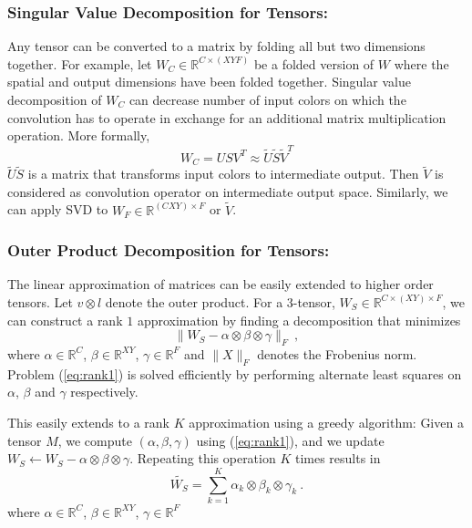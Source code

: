 \subsubsection{Singular Value Decomposition for Tensors:}\label{subsubsec:svd_tensor}
Any tensor can be converted to a matrix by folding all but two
dimensions together.  For example, let $W_C \in \mathbb{R}^{C \times (XYF)}$ be a folded version of $W$ where the spatial and output dimensions have been folded together. Singular value decomposition of
$W_C$ can decrease number of input colors on which the convolution has to
operate in exchange for an additional matrix multiplication
operation. More formally, $$W_C = USV^T \approx
\tilde{U}\tilde{S}\tilde{V}^T$$
 $\tilde{U}\tilde{S}$ is a matrix that
transforms input colors to intermediate output.  Then $\tilde{V}$ is
considered as convolution operator on intermediate output space. 
Similarly, we can apply SVD to $W_F \in \mathbb{R}^{(CXY) \times F}$ or $\tilde{V}$. 

\vspace{-0.3cm}
\subsubsection{Outer Product Decomposition for Tensors:}\label{subsubsec:outer}
The linear approximation of matrices can be easily extended to higher order tensors.
Let $v \otimes l$ denote the outer product.
For a 3-tensor, $W_S \in \mathbb{R}^{C \times (XY) \times F}$, we can construct a rank $1$ approximation by finding a decomposition that minimizes 
\begin{equation}
\label{eq:rank1}
	\| W_S - \alpha \otimes \beta \otimes \gamma \|_F~,
\end{equation} 
where $\alpha \in \mathbb{R}^C$, $\beta \in \mathbb{R}^{XY}$, $\gamma \in \mathbb{R}^F$ and $\|X\|_F$ denotes the Frobenius norm.
Problem (\ref{eq:rank1}) is solved efficiently by performing alternate least squares 
on $\alpha$, $\beta$ and $\gamma$ respectively. 

This easily extends to a rank $K$ approximation using a greedy algorithm: Given a 
tensor $M$, we compute $(\alpha, \beta, \gamma)$ using (\ref{eq:rank1}), and we update 
$W_S \leftarrow W_S - \alpha \otimes \beta \otimes \gamma$. Repeating this operation $K$
times results in 
\begin{equation}
\label{eq:rankK}
	\tilde{W_S} = \sum_{k = 1}^{K} \alpha_k \otimes \beta_k \otimes \gamma_k ~.
\end{equation} 
where $\alpha \in \mathbb{R}^C$, $\beta \in \mathbb{R}^{XY}$, $\gamma \in \mathbb{R}^F$ 

